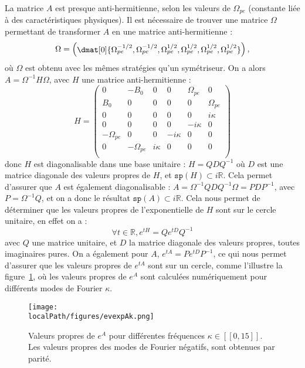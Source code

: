 La matrice $A$ est presque anti-hermitienne, selon les valeurs de $\Omega_{pe}$ (constante liée à des caractéristiques physiques).  Il est nécessaire de trouver une matrice $\Omega$ permettant de transformer $A$ en une matrice anti-hermitienne :
$$
  \Omega = 
  \begin{pmatrix}
    \dmat[0]{\Omega_{pe}^{-1/2},\Omega_{pe}^{-1/2},\Omega_{pe}^{1/2},\Omega_{pe}^{1/2},\Omega_{pe}^{1/2},\Omega_{pe}^{1/2}}
  \end{pmatrix},
$$
où $\Omega$ est obtenu avec les mêmes stratégies qu'un symétriseur. On a alors $A = \Omega^{-1}H\Omega$, avec $H$ une matrice anti-hermitienne :
$$
  H = \begin{pmatrix}
    0           & -B_0         & 0       &  0       &  \Omega_{pe}  & 0           \\
    B_0         &  0           & 0       &  0       &  0            & \Omega_{pe} \\
    0           &  0           & 0       &  0       &  0            & i\kappa     \\
    0           &  0           & 0       &  0       & -i\kappa      & 0           \\
   -\Omega_{pe} &  0           & 0       & -i\kappa &  0            & 0           \\
    0           & -\Omega_{pe} & i\kappa &  0       &  0            & 0           \\
  \end{pmatrix}
$$
donc $H$ est diagonalisable dans une base unitaire : $H = QDQ^{-1}$ où $D$ est une matrice diagonale des valeurs propres de $H$, et $\texttt{sp}(H)\subset i\mathbb{R}$. Cela permet d'assurer que $A$ est également diagonalisable : $A = \Omega^{-1}QDQ^{-1}\Omega = PDP^{-1}$, avec $P=\Omega^{-1}Q$, et on a donc le résultat $\texttt{sp}(A)\subset i\mathbb{R}$. Cela nous permet de déterminer que les valeurs propres de l'exponentielle de $H$ sont sur le cercle unitaire, en effet on a :
$$
  \forall t\in\mathbb{R}, e^{tH} = Qe^{tD}Q^{-1}
$$
avec $Q$ une matrice unitaire, et $D$ la matrice diagonale des valeurs propres, toutes imaginaires pures. On a également pour $A$, $e^{tA}=Pe^{tD}P^{-1}$, ce qui nous permet d'assurer que les valeurs propres de $e^{tA}$ sont sur un cercle, comme l'illustre la figure~\ref{fig:evexpAk}, où les valeurs propres de $e^{A}$ sont calculées numériquement pour différents modes de Fourier $\kappa$.

\begin{figure}
  \centering
  \texttt{[image: \\localPath/figures/evexpAk.png]}
  \caption{Valeurs propres de $e^{A}$ pour différentes fréquences $\kappa\in[\![0,15]\!]$. Les valeurs propres des modes de Fourier négatifs, sont obtenues par parité.}
  \label{fig:evexpAk}
\end{figure}

